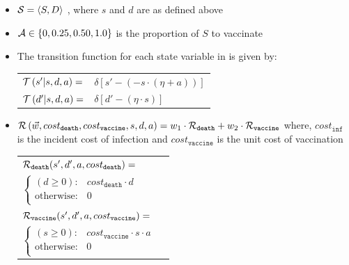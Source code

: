\begin{itemize}
    \item {\footnotesize $ \mathcal{S} = \left\langle S, D \right\rangle$ }, where $ s $ and $ d $ are as defined above
    \item {\footnotesize $ \mathcal{A} \in \left\lbrace 0, 0.25, 0.50, 1.0 \right\rbrace $} is the proportion of $ S $ to vaccinate
    \item The transition function {\footnotesize \Transition} for each state variable in {\footnotesize \State} is given by:    \\
    {\footnotesize 
        \abovedisplayskip=5pt
        \belowdisplayskip=0pt
        \renewcommand{\arraystretch}{1.5}
        \begin{tabular}{ll}
            $ \mathcal{T}\left( s' | s, d, a \right) =$ & $ \delta \left[ s' - (- s \cdot (\eta + a)) \right] $ \\
            $ \mathcal{T}\left( d' | s, d, a \right) =$ & $ \delta \left[ d' - (\eta \cdot s) \right] $ \\
        \end{tabular}
    }%
    \item {\footnotesize $ \mathcal{R}\left(\vec{w}, cost_{\mathtt{death}}, cost_{\mathtt{vaccine}}, s, d, a \right) = w_1 \cdot \mathcal{R}_{\mathtt{death}} + w_2 \cdot \mathcal{R}_{\mathtt{vaccine}}$} where, {\footnotesize $ cost_{\mathtt{inf}} $} is the incident cost of infection and {\footnotesize $ cost_{\mathtt{vaccine}} $} is the unit cost of vaccination \\
    {\footnotesize 
        \abovedisplayskip=10pt
        \belowdisplayskip=0pt
        \renewcommand{\arraystretch}{1.5}
        \begin{tabular}{ll}    
            $ \mathcal{R}_{\mathtt{death}}(s', d', a, cost_{\mathtt{death}}) = $ &  $ $ \\
                \qquad $ \begin{cases}
                (d \geq 0) : & cost_{\mathtt{death}} \cdot d \\
                \text{otherwise} : & 0 \\
                \end{cases} $ & $ $ \\
            $ \mathcal{R}_{\mathtt{vaccine}}(s', d', a, cost_{\mathtt{vaccine}}) = $ &  $ $ \\
                \qquad $ \begin{cases}
                (s \geq 0) : & cost_{\mathtt{vaccine}} \cdot s \cdot a \\
                \text{otherwise} : & 0 \\
                \end{cases} $ & $ $ \\
        \end{tabular}
    }    
\end{itemize} 

